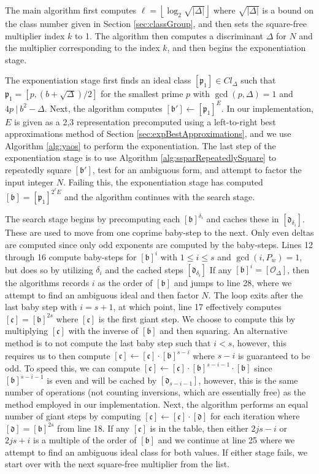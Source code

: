 \documentclass{ucalgthes1}
\theoremstyle{definition}
\newcommand{\floor}[1]{\left\lfloor #1 \right\rfloor}
\newcommand{\ideal}{\mathfrak}
\newcommand{\idealclass}[1]{\left[ \ideal #1 \right]}
\newcommand{\bclass}{\idealclass b}
\newcommand{\cclass}{\idealclass c}
\newcommand{\dclass}{\idealclass d}
\newcommand{\idclass}{[\mathcal O_\Delta]}
\newcommand{\hdelta}{\sqrt{|\Delta|}}
\begin{document}
The main algorithm first computes $\ell = \floor{\log_2 \hdelta}$ where $\hdelta$ is a bound on the class number given in Section \ref{sec:classGroup}, and then sets the square-free multiplier index $k$ to 1.  The algorithm then computes a discriminant $\Delta$ for $N$ and the multiplier corresponding to the index $k$, and then begins the exponentiation stage.

The exponentiation stage first finds an ideal class $\idealclass{p_1} \in Cl_\Delta$ such that $\ideal{p_1} = [p, (b + \sqrt\Delta)/2]$ for the smallest prime $p$ with $\gcd(p, \Delta) = 1$ and $4p ~|~ b^2 - \Delta$. Next, the algorithm computes $\idealclass{b'} \gets \idealclass{p_1}^E$.  In our implementation, $E$ is given as a 2,3 representation precomputed using a left-to-right best approximations method of Section \ref{sec:expBestApproximations}, and we use Algorithm \ref{alg:yaos} to perform the exponentiation.  The last step of the exponentiation stage is to use Algorithm \ref{alg:ssparRepeatedlySquare} to repeatedly square $\idealclass{b'}$, test for an ambiguous form, and attempt to factor the input integer $N$.  Failing this, the exponentiation stage has computed $\bclass = \idealclass{p_1}^{2^\ell E}$ and the algorithm continues with the search stage.

The search stage begins by precomputing each $\bclass^{\delta_i}$ and caches these in $\idealclass{d_{\delta_i}}$.  These are used to move from one coprime baby-step to the next.  Only even deltas are computed since only odd exponents are computed by the baby-steps.  Lines 12 through 16 compute baby-steps for $\bclass^i$ with $1 \le i \le s$ and $\gcd(i, P_w) = 1$, but does so by utilizing $\delta_i$ and the cached steps $\idealclass{d_{\delta_i}}$  If any $\bclass^i = \idclass$, then the algorithms records $i$ as the order of $\bclass$ and jumps to line 28, where we attempt to find an ambiguous ideal and then factor $N$.  The loop exits after the last baby step with $i = s+1$, at which point, line 17 effectively computes $\cclass = \bclass^{2s}$ where $\cclass$ is the first giant step.  We choose to compute this by multiplying $\cclass$ with the inverse of $\bclass$ and then squaring.  An alternative method is to not compute the last baby step such that $i < s$, however, this requires us to then compute $\cclass \gets \cclass \cdot \bclass^{s-i}$ where $s-i$ is guaranteed to be odd.  To speed this, we can compute $\cclass \gets \cclass \cdot \bclass^{s-i-1} \cdot \bclass$ since $\bclass^{s-i-1}$ is even and will be cached by $\idealclass{d_{s-i-1}}$, however, this is the same number of operations (not counting inversions, which are essentially free) as the method employed in our implementation.  Next, the algorithm performs an equal number of giant steps by computing $\cclass \gets \cclass \cdot \dclass$ for each iteration where $\dclass = \bclass^{2s}$ from line 18.  If any $\cclass$ is in the table, then either $2js-i$ or $2js+i$ is a multiple of the order of $\bclass$ and we continue at line 25 where we attempt to find an ambiguous ideal class for both values.  If either stage fails, we start over with the next square-free multiplier from the list.
\end{document}
